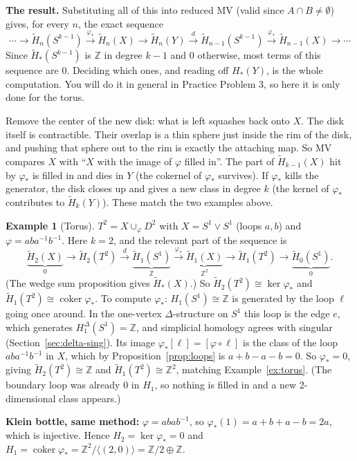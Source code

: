 \documentclass[11pt]{article}
\newcommand{\Z}{\mathbb Z}
\newcommand{\coker}{\operatorname{coker}}
\newcommand{\Hred}{\tilde H}
\theoremstyle{definition}
\newtheorem{ex}[thm]{Example}
\begin{document}
\medskip\noindent\textbf{The result.} Substituting all of this into reduced MV (valid since $A\cap B\neq\emptyset$) gives, for every $n$, the exact sequence
\[\cdots\to\Hred_n(S^{k-1})\xrightarrow{\varphi_*}\Hred_n(X)\longrightarrow\Hred_n(Y)\xrightarrow{\ d\ }\Hred_{n-1}(S^{k-1})\xrightarrow{\varphi_*}\Hred_{n-1}(X)\to\cdots\]
Since $\Hred_*(S^{k-1})$ is $\Z$ in degree $k-1$ and $0$ otherwise, most terms of this sequence are $0$. Deciding which ones, and reading off $H_*(Y)$, is the whole computation. You will do it in general in Practice Problem 3, so here it is only done for the torus.
\begin{intuition}
Remove the center of the new disk: what is left squashes back onto $X$. The disk itself is contractible. Their overlap is a thin sphere just inside the rim of the disk, and pushing that sphere out to the rim is exactly the attaching map. So MV compares $X$ with ``$X$ with the image of $\varphi$ filled in''. The part of $\Hred_{k-1}(X)$ hit by $\varphi_*$ is filled in and dies in $Y$ (the cokernel of $\varphi_*$ survives). If $\varphi_*$ kills the generator, the disk closes up and gives a new class in degree $k$ (the kernel of $\varphi_*$ contributes to $\Hred_k(Y)$). These match the two examples above.
\end{intuition}

\begin{ex}[Torus]
$T^2=X\cup_\varphi D^2$ with $X=S^1\vee S^1$ (loops $a,b$) and $\varphi=aba^{-1}b^{-1}$. Here $k=2$, and the relevant part of the sequence is
\[\underbrace{\Hred_2(X)}_{0}\to\Hred_2(T^2)\xrightarrow{d}\underbrace{\Hred_1(S^1)}_{\Z}\xrightarrow{\varphi_*}\underbrace{\Hred_1(X)}_{\Z^2}\to\Hred_1(T^2)\to\underbrace{\Hred_0(S^1)}_{0}.\]
(The wedge sum proposition gives $\Hred_*(X)$.) So $\Hred_2(T^2)\cong\ker\varphi_*$ and $\Hred_1(T^2)\cong\coker\varphi_*$. To compute $\varphi_*$: $H_1(S^1)\cong\Z$ is generated by the loop $\ell$ going once around. In the one-vertex $\Delta$-structure on $S^1$ this loop is the edge $e$, which generates $H^\Delta_1(S^1)=\Z$, and simplicial homology agrees with singular (Section~\ref{sec:delta-sing}). Its image $\varphi_*[\ell]=[\varphi\circ\ell]$ is the class of the loop $aba^{-1}b^{-1}$ in $X$, which by Proposition~\ref{prop:loops} is $a+b-a-b=0$. So $\varphi_*=0$, giving $\Hred_2(T^2)\cong\Z$ and $\Hred_1(T^2)\cong\Z^2$, matching Example~\ref{ex:torus}. (The boundary loop was already $0$ in $H_1$, so nothing is filled in and a new 2-dimensional class appears.)

\textbf{Klein bottle, same method:} $\varphi=abab^{-1}$, so $\varphi_*(1)=a+b+a-b=2a$, which is injective. Hence $H_2=\ker\varphi_*=0$ and $H_1=\coker\varphi_*=\Z^2/\langle(2,0)\rangle=\Z/2\oplus\Z$.
\end{ex}
\end{document}
